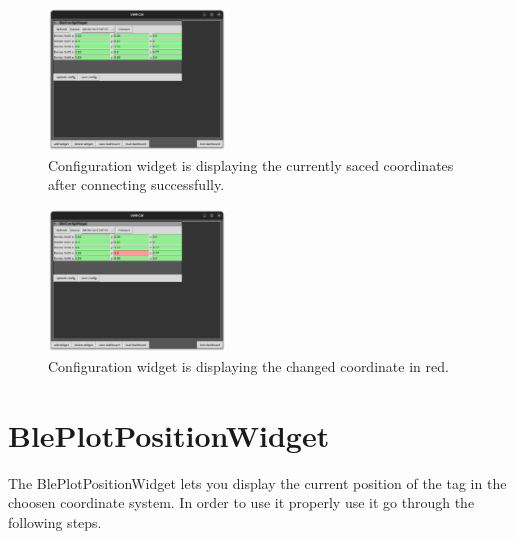 \begin{figure}[!hbt]
	\centering
	\includegraphics[width=0.42\textwidth]{pictures/config_device_connected.png}
	\caption{Configuration widget is displaying the currently saced coordinates after connecting successfully.}
	\label{fig:config_device_connected}
\end{figure}

\begin{figure}[!hbt]
	\centering
	\includegraphics[width=0.42\textwidth]{pictures/config_coordinate_changed.png}
	\caption{Configuration widget is displaying the changed coordinate in red. }
	\label{fig:config_coordinate_changed}
\end{figure}

\newpage

\section{BlePlotPositionWidget}

The BlePlotPositionWidget lets you display the current position of the tag in the choosen coordinate system. 
In order to use it properly use it go through the following steps. 

